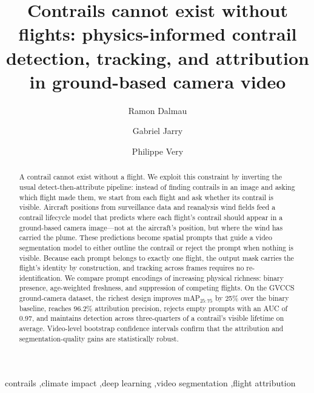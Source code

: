 \documentclass[1p,11pt]{elsarticle}
\begin{document}
\begin{frontmatter}

\title{Contrails cannot exist without flights: physics-informed contrail detection, tracking, and attribution in ground-based camera video}

\author[ec]{Ramon Dalmau}
\author[ec]{Gabriel Jarry}
\author[ec]{Philippe Very}

\begin{abstract}
A contrail cannot exist without a flight. We exploit this constraint by inverting the usual detect-then-attribute pipeline: instead of finding contrails in an image and asking which flight made them, we start from each flight and ask whether its contrail is visible. Aircraft positions from surveillance data and reanalysis wind fields feed a contrail lifecycle model that predicts where each flight's contrail should appear in a ground-based camera image---not at the aircraft's position, but where the wind has carried the plume. These predictions become spatial prompts that guide a video segmentation model to either outline the contrail or reject the prompt when nothing is visible. Because each prompt belongs to exactly one flight, the output mask carries the flight's identity by construction, and tracking across frames requires no re-identification. We compare prompt encodings of increasing physical richness: binary presence, age-weighted freshness, and suppression of competing flights. On the GVCCS ground-camera dataset, the richest design improves mAP$_{25:75}$ by 25\% over the binary baseline, reaches 96.2\% attribution precision, rejects empty prompts with an AUC of 0.97, and maintains detection across three-quarters of a contrail's visible lifetime on average. Video-level bootstrap confidence intervals confirm that the attribution and segmentation-quality gains are statistically robust.
\end{abstract}

\begin{keyword}
contrails \sep climate impact \sep deep learning \sep video segmentation \sep flight attribution
\end{keyword}

\end{frontmatter}
\end{document}

